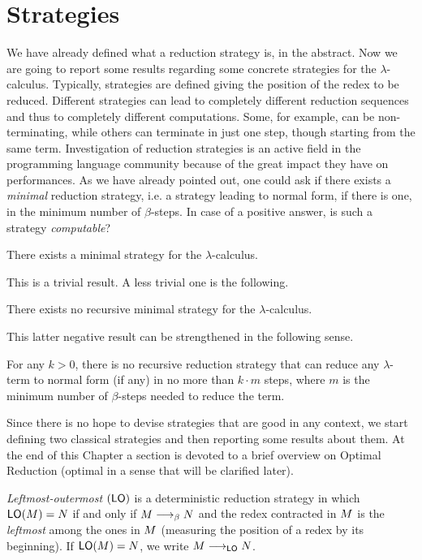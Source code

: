 \section{Strategies}
We have already defined what a reduction strategy is, in the abstract. Now we are going to report some results regarding some concrete strategies for the $\lambda$-calculus. Typically, strategies are defined giving the position of the redex to be reduced. Different strategies can lead to completely different reduction sequences and thus to completely different computations. Some, for example, can be non-terminating, while others can terminate in just one step, though starting from the same term. Investigation of reduction strategies is an active field in the programming language community because of the great impact they have on performances. As we have already pointed out, one could ask if there exists a \emph{minimal} reduction strategy, i.e. a strategy leading to normal form, if there is one, in the minimum number of $\beta$-steps. In case of a positive answer, is such a strategy \emph{computable}?
\begin{proposition}
	There exists a minimal strategy for the $\lambda$-calculus.
\end{proposition}
This is a trivial result. A less trivial one is the following.
\begin{theorem}\label{theorem:imp}
	There exists no recursive minimal strategy for the $\lambda$-calculus.
\end{theorem}
This latter negative result can be strengthened in the following sense.
\begin{theorem}
	For any $k>0$, there is no recursive reduction strategy that can reduce any $\lambda$-term to normal form (if any) in no more than $k\cdot m$ steps, where $m$ is the minimum number of $\beta$-steps needed to reduce the term.
\end{theorem}
Since there is no hope to devise strategies that are good in any context, we start defining two classical strategies and then reporting some results about them. At the end of this Chapter a section is devoted to a brief overview on Optimal Reduction (optimal in a sense that will be clarified later).
\begin{definition}
	\emph{Leftmost-outermost} $(\textsf{LO})$ is a deterministic reduction
	strategy in which $\textsf{LO}(M)=N$ if and only if
	$M\longrightarrow_\beta N$ and the redex contracted in $M$ is
	the \emph{leftmost} among the ones in $M$ (measuring the
	position of a redex by its beginning). If $\textsf{LO}(M)=N$,
	we write $M\longrightarrow_{\textsf{LO}}N$.
\end{definition}
